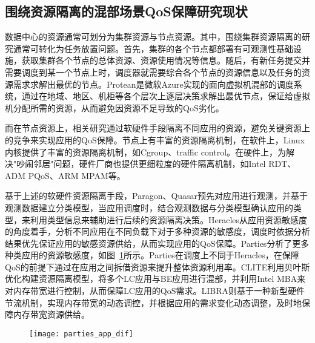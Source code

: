 \subsection{围绕资源隔离的混部场景QoS保障研究现状}


数据中心的资源通常可划分为集群资源与节点资源。其中，围绕集群资源隔离的研究通常可转化为任务放置问题。首先，集群的各个节点都部署有可观测性基础设施，获取集群各个节点的总体资源、资源使用情况等信息。随后，有新任务提交并需要调度到某一个节点上时，调度器就需要综合各个节点的资源信息以及任务的资源需求求解出最优的节点。Protean\citep{hadary2020protean}是微软Azure实现的面向虚拟机混部的调度系统，通过在地域、地区、机柜等各个层次上逐层决策求解出最优节点，保证给虚拟机分配所需的资源，从而避免因资源不足导致的QoS劣化。

而在节点资源上，相关研究通过软硬件手段隔离不同应用的资源，避免关键资源上的竞争来实现应用的QoS保障。节点上有丰富的资源隔离机制，在软件上，Linux内核提供了丰富的资源隔离机制，如Cgroup、traffic control。在硬件上，为解决"吵闹邻居"问题\citep{xu2018dcat, maricq2018taming, rzadca2020autopilot, kwon2020dc}，硬件厂商也提供更细粒度的硬件隔离机制，如Intel RDT、ADM PQoS\citep{amdpqos}、ARM MPAM\citep{armmpam}等。

基于上述的软硬件资源隔离手段，Paragon\citep{delimitrou2013paragon}、Quasar\citep{delimitrou2014quasar}预先对应用进行观测，并基于观测数据建立分类模型，当应用调度时，结合观测数据与分类模型确认应用的类型，来利用类型信息来辅助进行后续的资源隔离决策。Heracles\citep{lo2015heracles}从应用资源敏感度的角度着手，分析不同应用在不同负载下对于多种资源的敏感度，调度时依据分析结果优先保证应用的敏感资源供给，从而实现应用的QoS保障。Parties\citep{chen2019parties}分析了更多种类应用的资源敏感度，如图~\ref{fig:parties_app_dif}所示。Parties在调度上不同于Heracles，在保障QoS的前提下通过在应用之间拆借资源来提升整体资源利用率。CLITE\citep{patel2020clite}利用贝叶斯优化构建资源隔离模型，将多个LC应用与BE应用进行混部，并利用Intel MBA来对内存带宽进行控制，从而保障LC应用的QoS需求。LIBRA\citep{zhang2021libra}则基于一种新型硬件节流机制，实现内存带宽的动态调控，并根据应用的需求变化动态调整，及时地保障内存带宽资源供给。

\begin{figure}[!htbp]
    \centering
    \texttt{[image: parties\_app\_dif]}
    \label{fig:parties_app_dif}
\end{figure}

